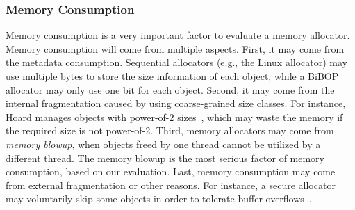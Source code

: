 \subsubsection{Memory Consumption}
\label{sec:memoryconsumption}

Memory consumption is a very important factor to evaluate a memory allocator. Memory consumption will come from multiple aspects. First, it may come from the metadata consumption. Sequential allocators (e.g., the Linux allocator) may use multiple bytes to store the size information of each object, while a BiBOP allocator may only use one bit for each object. Second, it may come from the internal fragmentation caused by using coarse-grained size classes. For instance, Hoard manages objects with power-of-2 sizes~\citep{Hoard}, which may waste the memory if the required size is not power-of-2. Third, memory allocators may come from \textit{memory blowup}, when objects freed by one thread cannot be utilized by a different thread. The memory blowup is the most serious factor of memory consumption, based on our evaluation. Last, memory consumption may come from external fragmentation or other reasons. For instance, a secure allocator may voluntarily skip some objects in order to tolerate buffer overflows~\citep{DieHard}. 



